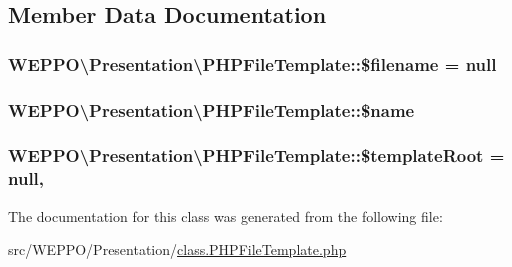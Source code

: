 \subsection{Member Data Documentation}
\subsubsection[{\texorpdfstring{\$filename}{$filename}}]{\setlength{\rightskip}{0pt plus 5cm}W\+E\+P\+P\+O\textbackslash{}\+Presentation\textbackslash{}\+P\+H\+P\+File\+Template\+::\$filename = null\hspace{0.3cm}{\ttfamily [protected]}}\hypertarget{classWEPPO_1_1Presentation_1_1PHPFileTemplate_a2277c9a0683795bb748b30a55293c668}{}\label{classWEPPO_1_1Presentation_1_1PHPFileTemplate_a2277c9a0683795bb748b30a55293c668}
\subsubsection[{\texorpdfstring{\$name}{$name}}]{\setlength{\rightskip}{0pt plus 5cm}W\+E\+P\+P\+O\textbackslash{}\+Presentation\textbackslash{}\+P\+H\+P\+File\+Template\+::\$name\hspace{0.3cm}{\ttfamily [protected]}}\hypertarget{classWEPPO_1_1Presentation_1_1PHPFileTemplate_a167680b0ee6c9bd8a67655ab9f65fa2a}{}\label{classWEPPO_1_1Presentation_1_1PHPFileTemplate_a167680b0ee6c9bd8a67655ab9f65fa2a}
\subsubsection[{\texorpdfstring{\$template\+Root}{$templateRoot}}]{\setlength{\rightskip}{0pt plus 5cm}W\+E\+P\+P\+O\textbackslash{}\+Presentation\textbackslash{}\+P\+H\+P\+File\+Template\+::\$template\+Root = null\hspace{0.3cm}{\ttfamily [static]}, {\ttfamily [protected]}}\hypertarget{classWEPPO_1_1Presentation_1_1PHPFileTemplate_a02b49f31783cc5edff15e260801a5a3b}{}\label{classWEPPO_1_1Presentation_1_1PHPFileTemplate_a02b49f31783cc5edff15e260801a5a3b}


The documentation for this class was generated from the following file\+:\begin{DoxyCompactItemize}
\item 
src/\+W\+E\+P\+P\+O/\+Presentation/\hyperlink{class_8PHPFileTemplate_8php}{class.\+P\+H\+P\+File\+Template.\+php}\end{DoxyCompactItemize}
